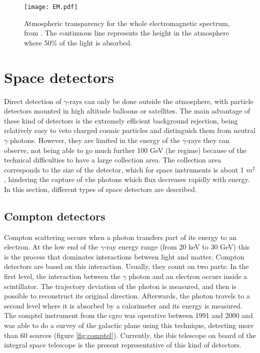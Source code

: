 \documentclass[main.tex]{subfiles}
\begin{document}
\begin{figure}
\centering
 \texttt{[image: EM.pdf]}
  \caption{Atmospheric transparency for the whole electromagnetic spectrum, from \cite{highenergyastrophy}. The continuous line represents the height in the atmosphere where 50\% of the light is absorbed.}
    \label{fig:atmoabsorb}
\end{figure}


\section{Space detectors} \label{sec:spacedet}

Direct detection of $\gamma$-rays can only be done outside the atmosphere, with particle detectors mounted in high altitude balloons or satellites. The main advantage of these kind of detectors is the extremely efficient background rejection, being relatively easy to veto charged cosmic particles and distinguish them from neutral $\gamma$ photons. However, they are limited in the energy of the $\gamma$-rays they can observe, not being able to go much further 100 GeV (\gls{he} regime) because of the technical difficulties to have a large collection area. The collection area corresponds to the size of the detector, which for space instruments is about 1 $m^2$, hindering the capture of \gls{vhe} photons which flux decreases rapidly with energy.\\
In this section, different types of space detectors are described.\\

\subsection{Compton detectors}\label{sec:comptondetectors}

Compton scattering occurs when a photon transfers part of its energy to an electron. At the low end of the $\gamma$-ray energy range (from 20 keV to 30 GeV) this is the process that dominates interactions between light and matter. Compton detectors are based on this interaction. Usually, they count on two parts: In the first level, the interaction between the $\gamma$ photon and an electron occurs inside a scintillator. The trajectory deviation of the photon is measured, and then is possible to reconstruct its original direction. Afterwards, the photon travels to a second level where it is absorbed by a calorimeter and its energy is measured. The \gls{comptel} instrument from the \gls{cgro} was operative between 1991 and 2000 and was able to do a survey of the galactic plane using this technique, detecting more than 60 sources (figure \ref{fig:comptel}). Currently, the \gls{ibis} \cite{IBIS} telescope on board of the \gls{integral} \cite{INTEGRAL} space telescope is the present representative of this kind of detectors.
\end{document}
